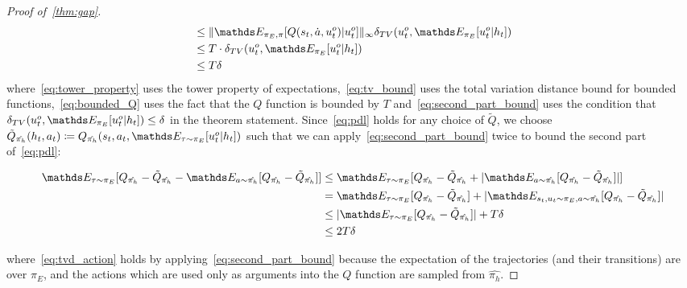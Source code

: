 \begin{proof}[Proof of~\cref{thm:gap}]
\begin{align}
&\leq \norm{\expectE_{\pi_E,\pi}[Q(s_t,\dot{a},u^o_t)\lvert u^o_t]}_{\infty}\delta_{TV}(u^o_t,\expectE_{\pi_E}[u^o_t\lvert h_t])\label{eq:tv_bound}\\
&\leq T \cdot\delta_{TV}(u^o_t,\expectE_{\pi_E}[u^o_t\lvert h_t])\label{eq:bounded_Q}\\
&\leq T\delta \label{eq:second_part_bound}
\end{align}
%
where~\cref{eq:tower_property} uses the tower property of expectations,~\cref{eq:tv_bound} uses the total variation distance bound for bounded functions,~\cref{eq:bounded_Q} uses the fact that the $Q$ function is bounded by $T$ and~\cref{eq:second_part_bound} uses the condition that $\delta_{TV}(u^o_t,\expectE_{\pi_E}[u^o_t\lvert h_t])\leq\delta$ in the theorem statement. Since~\cref{eq:pdl} holds for any choice of $\tilde{Q}$, we choose $\tilde{Q}_{\hat{\pi_h}}(h_t,a_t)\coloneqq Q_{\hat{\pi_h}}(s_t,a_t,\expectE_{\tau\sim \pi_E}[u^o_t\lvert h_t])$ such that we can apply~\cref{eq:second_part_bound} twice to bound the second part of~\cref{eq:pdl}:

\begin{align}
\expectE_{\tau\sim\pi_E}[Q_{\hat{\pi_h}}-\tilde{Q}_{\hat{\pi_h}}-\expectE_{a\sim\hat{\pi_h}}[Q_{\hat{\pi_h}}-\tilde{Q}_{\hat{\pi_h}}]]&\leq \expectE_{\tau\sim\pi_E}[Q_{\hat{\pi_h}}-\tilde{Q}_{\hat{\pi_h}}+\abs{\expectE_{a\sim\hat{\pi_h}}[Q_{\hat{\pi_h}}-\tilde{Q}_{\hat{\pi_h}}]}]\nonumber\\
&=\expectE_{\tau\sim\pi_E}[Q_{\hat{\pi_h}}-\tilde{Q}_{\hat{\pi_h}}]+\abs{\expectE_{s_t,u_t\sim\pi_E,a\sim\hat{\pi_h}}[Q_{\hat{\pi_h}}-\tilde{Q}_{\hat{\pi_h}}]}\nonumber\\
&\leq \abs{\expectE_{\tau\sim\pi_E}[Q_{\hat{\pi_h}}-\tilde{Q}_{\hat{\pi_h}}]}+T\delta\label{eq:tvd_action}\\
&\leq 2T\delta\nonumber
\end{align}

where~\cref{eq:tvd_action} holds by applying~\cref{eq:second_part_bound} because the expectation of the trajectories (and their transitions) are over $\pi_E$, and the actions which are used only as arguments into the $Q$ function are sampled from $\hat{\pi_h}$.



\end{proof}
